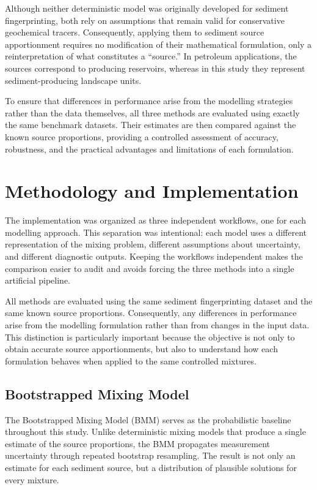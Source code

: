 \documentclass[
  12pt,
  letterpaper,
]{book}
\begin{document}
Although neither deterministic model was originally developed for
sediment fingerprinting, both rely on assumptions that remain valid for
conservative geochemical tracers. Consequently, applying them to
sediment source apportionment requires no modification of their
mathematical formulation, only a reinterpretation of what constitutes a
``source.'' In petroleum applications, the sources correspond to
producing reservoirs, whereas in this study they represent
sediment-producing landscape units.

To ensure that differences in performance arise from the modelling
strategies rather than the data themselves, all three methods are
evaluated using exactly the same benchmark datasets. Their estimates are
then compared against the known source proportions, providing a
controlled assessment of accuracy, robustness, and the practical
advantages and limitations of each formulation.

\section{Methodology and
Implementation}\label{methodology-and-implementation-10}

The implementation was organized as three independent workflows, one for
each modelling approach. This separation was intentional: each model
uses a different representation of the mixing problem, different
assumptions about uncertainty, and different diagnostic outputs. Keeping
the workflows independent makes the comparison easier to audit and
avoids forcing the three methods into a single artificial pipeline.

All methods are evaluated using the same sediment fingerprinting dataset
and the same known source proportions. Consequently, any differences in
performance arise from the modelling formulation rather than from
changes in the input data. This distinction is particularly important
because the objective is not only to obtain accurate source
apportionments, but also to understand how each formulation behaves when
applied to the same controlled mixtures.

\subsection{Bootstrapped Mixing Model}\label{bootstrapped-mixing-model}

The Bootstrapped Mixing Model (BMM) serves as the probabilistic baseline
throughout this study. Unlike deterministic mixing models that produce a
single estimate of the source proportions, the BMM propagates
measurement uncertainty through repeated bootstrap resampling. The
result is not only an estimate for each sediment source, but a
distribution of plausible solutions for every mixture.
\end{document}
